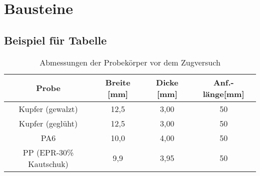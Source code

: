 \chapter{Bausteine}

\section{Beispiel für Tabelle}

\vspace*{-2.5mm}
\renewcommand{\arraystretch}{1.2}
\begin{table}[h!]
	\centering
	\caption{Abmessungen der Probekörper vor dem Zugversuch}
	\label{tab:tabelle1}
	\begin{tabulary}{\textwidth}{C|CCC}
		\hline
		\textbf{Probe}  &\textbf{Breite [mm]}&\textbf{Dicke [mm]}&\textbf{Anf.-länge[mm]} \\ 
		\hline
		Kupfer (gewalzt) & 12,5 &3,00&50\\
		Kupfer (geglüht) & 12,5&3,00&50\\
		PA6 & 10,0&4,00&50\\
		PP (EPR-30\% Kautschuk) & 9,9 &3,95&50\\
		\hline
	\end{tabulary}
\end{table}

\FloatBarrier
\vspace*{-2.5mm}

